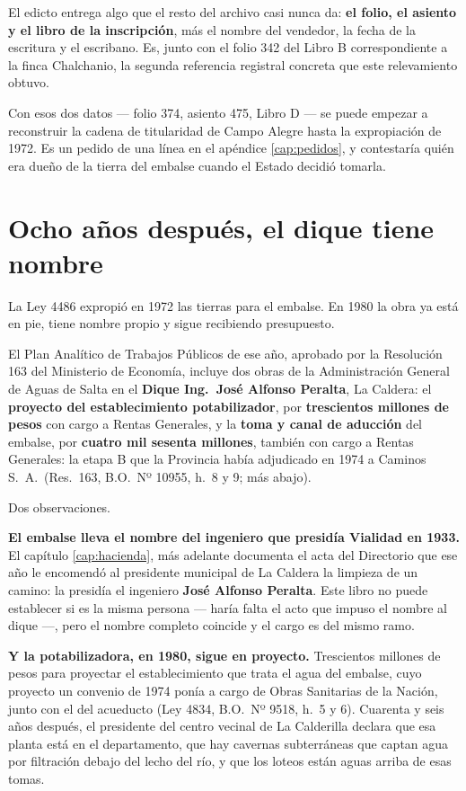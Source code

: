 \begin{cautela}
El edicto entrega algo que el resto del archivo casi nunca da: \textbf{el folio, el asiento y
el libro de la inscripción}, más el nombre del vendedor, la fecha de la escritura y el
escribano. Es, junto con el folio 342 del Libro B correspondiente a la finca Chalchanio, la
segunda referencia registral concreta que este relevamiento obtuvo.

Con esos dos datos --- folio 374, asiento 475, Libro D --- se puede empezar a reconstruir la
cadena de titularidad de Campo Alegre hasta la expropiación de 1972. Es un pedido de una
línea en el apéndice \ref{cap:pedidos}, y contestaría quién era dueño de la tierra del embalse cuando el
Estado decidió tomarla.
\end{cautela}

\section{Ocho años después, el dique tiene nombre}

La Ley 4486 expropió en 1972 las tierras para el embalse. En 1980 la obra ya está en pie,
tiene nombre propio y sigue recibiendo presupuesto.

El Plan Analítico de Trabajos Públicos de ese año, aprobado por la Resolución 163 del
Ministerio de Economía, incluye dos obras de la Administración General de Aguas de Salta en
el \textbf{Dique Ing.\ José Alfonso Peralta}, La Caldera: el \textbf{proyecto del
establecimiento potabilizador}, por \textbf{trescientos millones de pesos} con cargo a Rentas
Generales, y la \textbf{toma y canal de aducción} del embalse, por \textbf{cuatro mil sesenta millones}, también con cargo a Rentas Generales: la etapa B que la Provincia había adjudicado en 1974 a Caminos S.\ A.\ (Res.\ 163, B.O.\ Nº 10955, h.\ 8 y 9; más abajo).

Dos observaciones.

\textbf{El embalse lleva el nombre del ingeniero que presidía Vialidad en 1933.} El capítulo \ref{cap:hacienda}, más adelante
documenta el acta del Directorio que ese año le encomendó al presidente municipal de La
Caldera la limpieza de un camino: la presidía el ingeniero \textbf{José Alfonso Peralta}.
Este libro no puede establecer si es la misma persona --- haría falta el acto que impuso el
nombre al dique ---, pero el nombre completo coincide y el cargo es del mismo ramo.

\textbf{Y la potabilizadora, en 1980, sigue en proyecto.} Trescientos millones de pesos para proyectar el
establecimiento que trata el agua del embalse, cuyo proyecto un convenio de 1974 ponía a cargo de Obras Sanitarias de la Nación, junto con el del acueducto (Ley 4834, B.O.\ Nº 9518, h.\ 5 y 6). Cuarenta y seis años después, el presidente
del centro vecinal de La Calderilla declara que esa planta está en el departamento, que hay
cavernas subterráneas que captan agua por filtración debajo del lecho del río, y que los
loteos están aguas arriba de esas tomas.

